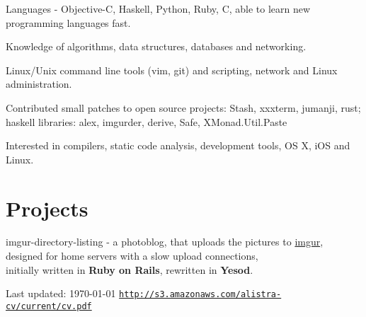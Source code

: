 \documentclass[letterpaper]{article}
\renewenvironment{itemize}{
  \begin{list}{}{
    \setlength{\leftmargin}{1.5em}
  }
}{
  \end{list}
}
\begin{document}
\begin{itemize}
	\item Languages - Objective-C, Haskell, Python, Ruby, C, able to learn new programming languages fast.
	\item Knowledge of algorithms, data structures, databases and networking.
    \item Linux/Unix command line tools (vim, git) and scripting, network and Linux administration.
	\item Contributed small patches to open source projects: Stash, xxxterm, jumanji, rust;\\
		 haskell libraries: alex, imgurder, derive, Safe, XMonad.Util.Paste
	\item Interested in compilers, static code analysis, development tools, OS X, iOS and Linux.
\end{itemize}

\section*{Projects}
\begin{itemize}
    \item imgur-directory-listing - a photoblog, that uploads the pictures to \href{http://imgur.com}{imgur},
        designed for home servers with a slow upload connections,\\ initially written in {\bf Ruby on Rails}, rewritten in {\bf Yesod}.
\end{itemize}

\bigskip

\begin{center}
  \begin{footnotesize}
    Last updated: \today
    \hfill
    \href{http://s3.amazonaws.com/alistra-cv/current/cv.pdf}
    {\texttt{http://s3.amazonaws.com/alistra-cv/current/cv.pdf}}
  \end{footnotesize}
\end{center}
\end{document}
